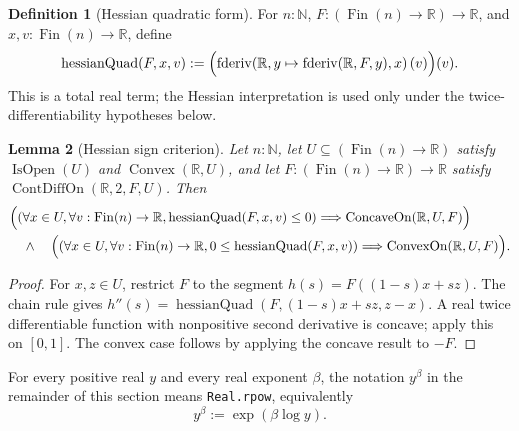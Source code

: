 \documentclass[9pt]{extarticle}
\newtheorem{lemma}{Lemma}[section]
\theoremstyle{definition}
\newtheorem{definition}[lemma]{Definition}
\theoremstyle{remark}
\newcommand{\R}{\mathbb R}
\newcommand{\N}{\mathbb N}
\begin{document}
\begin{definition}[Hessian quadratic form]
\label{def:hessian-quad}
For $n:\N$, $F:(\operatorname{Fin}(n)\to\R)\to\R$, and
$x,v:\operatorname{Fin}(n)\to\R$, define
\[
 \operatorname{hessianQuad}(F,x,v):=
 \Bigl(
  \operatorname{fderiv}\!\left(\R,
    y\mapsto\operatorname{fderiv}(\R,F,y),x\right)(v)
 \Bigr)(v).
\]
This is a total real term; the Hessian interpretation is used only under the
twice-differentiability hypotheses below.
\end{definition}

\begin{lemma}[Hessian sign criterion]\label{lem:hessian-sign-criterion}
Let $n:\N$, let $U\subseteq(\operatorname{Fin}(n)\to\R)$ satisfy
$\operatorname{IsOpen}(U)$ and $\operatorname{Convex}(\R,U)$, and let
$F:(\operatorname{Fin}(n)\to\R)\to\R$ satisfy
$\operatorname{ContDiffOn}(\R,2,F,U)$.  Then
\begin{align*}
 &\Bigl(
  (\forall x\in U,\forall v:\operatorname{Fin}(n)\to\R,
   \operatorname{hessianQuad}(F,x,v)\leq0)
  \Longrightarrow\operatorname{ConcaveOn}(\R,U,F)\Bigr)\\
 &\quad\wedge\quad
 \Bigl(
  (\forall x\in U,\forall v:\operatorname{Fin}(n)\to\R,
   0\leq\operatorname{hessianQuad}(F,x,v))
  \Longrightarrow\operatorname{ConvexOn}(\R,U,F)\Bigr).
\end{align*}
\end{lemma}

\begin{proof}
For $x,z\in U$, restrict $F$ to the segment
$h(s)=F((1-s)x+sz)$.  The chain rule gives
$h''(s)=\operatorname{hessianQuad}
(F,(1-s)x+sz,z-x)$.  A real twice differentiable function
with nonpositive second derivative is concave; apply this on $[0,1]$.  The
convex case follows by applying the concave result to $-F$.
\end{proof}

For every positive real $y$ and every real exponent $\beta$, the notation
$y^\beta$ in the remainder of this section means
\texttt{Real.rpow}, equivalently
\[
 y^\beta:=\exp(\beta\log y).
\]
\end{document}
